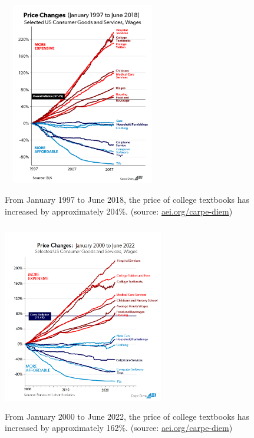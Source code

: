 \documentclass[11pt]{article}
\begin{document}
\begin{figure}[t]
\begin{minipage}[t]{8.0cm}
\includegraphics[width=70mm,height=80mm]{cpichart2018a.png}
\caption{\small From January 1997 to June 2018, the price of college textbooks has increased by approximately 204\%. (source: \href{aei.org/carpe-diem}{aei.org/carpe-diem}) }\label{fig:cpi-textbooks-2018}
\end{minipage}
\hfill
\begin{minipage}[t]{8.0cm}
\includegraphics[width=70mm,height=82mm]{cpi2022junea-3.png}
\caption{\small From January 2000 to June 2022, the price of college textbooks has increased by approximately 162\%. (source: \href{aei.org/carpe-diem}{aei.org/carpe-diem})}\label{fig:cpi-textbooks-2022}
\end{minipage}
\end{figure}
\end{document}
